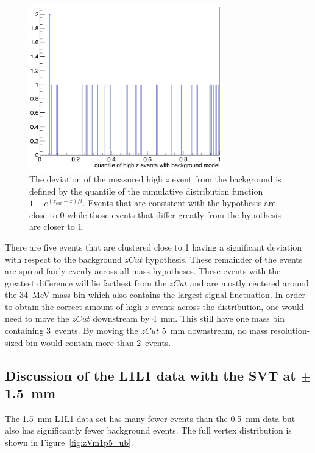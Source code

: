 \begin{figure}[htb]
  \centering
      \includegraphics[width=0.75\textwidth]{pics/results/highz_quantiles.png}
  \caption[Deviation of the measured high $z$ event from the background $zCut$]{The deviation of the measured high $z$ event from the background is defined by the quantile of the cumulative distribution function $1-e^{(z_{cut}-z)/l}$. Events that are consistent with the hypothesis are close to 0 while those events that differ greatly from the hypothesis are closer to 1.}
  \label{fig:highz_quantile}
\end{figure} 

There are five events that are clustered close to 1 having a significant deviation with respect to the background $zCut$ hypothesis. These remainder of the events are spread fairly evenly across all mass hypotheses. These events with the greatest difference will lie farthest from the $zCut$ and are mostly centered around the 34~MeV mass bin which also contains the largest signal fluctuation. In order to obtain the correct amount of high $z$ events across the distribution, one would need to move the $zCut$ downstream by 4~mm. This still have one mass bin containing 3~events. By moving the $zCut$ 5~mm downstream, no mass resolution-sized bin would contain more than 2~events. 

\subsection{Discussion of the L1L1 data with the SVT at $\pm$1.5~mm}
The 1.5~mm L1L1 data set has many fewer events than the 0.5~mm data but also has significantly fewer background events. The full vertex distribution is shown in Figure~\ref{fig:zVm1p5_ub}.

